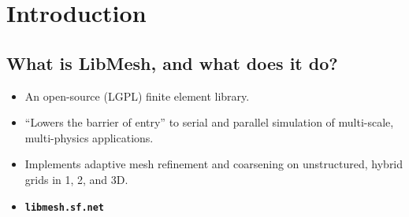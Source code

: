 
\section{Introduction}
\subsection*{What is LibMesh, and what does it do?}
\begin{frame}
  \begin{itemize}
  \itemsep=.75cm
  \item{An open-source (LGPL) finite element library.}
  \item{``Lowers the barrier of entry'' to serial and parallel
      simulation of multi-scale, multi-physics applications.}
  \item{Implements adaptive mesh refinement and coarsening on
      unstructured, hybrid grids in 1, 2, and 3D.}
  \item{\textbf{\texttt{libmesh.sf.net}}}
  \end{itemize}
\end{frame}
